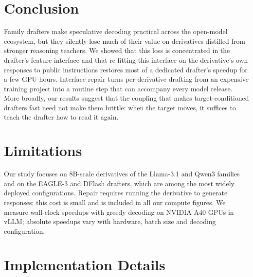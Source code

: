 \documentclass[11pt]{article}
\newcommand{\Ours}{Interface repair}
\begin{document}
\section{Conclusion}

Family drafters make speculative decoding practical across the open-model ecosystem, but they silently lose much of their value on derivatives distilled from stronger reasoning teachers.
We showed that this loss is concentrated in the drafter's feature interface and that re-fitting this interface on the derivative's own responses to public instructions restores most of a dedicated drafter's speedup for a few GPU-hours.
\Ours{} turns per-derivative drafting from an expensive training project into a routine step that can accompany every model release.
More broadly, our results suggest that the coupling that makes target-conditioned drafters fast need not make them brittle: when the target moves, it suffices to teach the drafter how to read it again.

\section*{Limitations}

Our study focuses on 8B-scale derivatives of the Llama-3.1 and Qwen3 families and on the EAGLE-3 and DFlash drafters, which are among the most widely deployed configurations.
Repair requires running the derivative to generate responses; this cost is small and is included in all our compute figures.
We measure wall-clock speedups with greedy decoding on NVIDIA A40 GPUs in vLLM; absolute speedups vary with hardware, batch size and decoding configuration.



\appendix

\section{Implementation Details}
\label{app:details}
\end{document}
